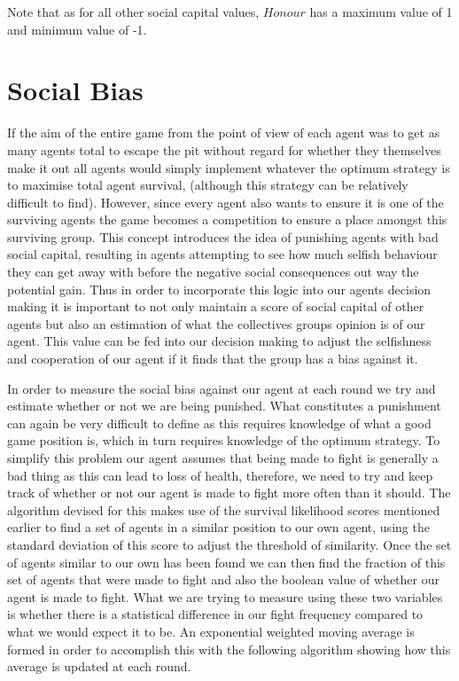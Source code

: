Note that as for all other social capital values, $Honour$ has a maximum value of 1 and minimum value of -1.

\section{Social Bias}

If the aim of the entire game from the point of view of each agent was to get as many agents total to escape the pit without regard for whether they themselves make it out all agents would simply implement whatever the optimum strategy is to maximise total agent survival, (although this strategy can be relatively difficult to find). However, since every agent also wants to ensure it is one of the surviving agents the game becomes a  competition to ensure a place amongst this surviving group. This concept introduces the idea of punishing agents with bad social capital, resulting in agents attempting to see how much selfish behaviour they can get away with before the negative social consequences out way the potential gain. Thus in order to incorporate this logic into our agents decision making it is important to not only maintain a score of social capital of other agents but also an estimation of what the collectives groups opinion is of our agent. This value can be fed into our decision making to adjust the selfishness and cooperation of our agent if it finds that the group has a bias against it. 

In order to measure the social bias against our agent at each round we try and estimate whether or not we are being punished. What constitutes a punishment can again be very difficult to define as this requires knowledge of what a good game position is, which in turn requires knowledge of the optimum strategy. To simplify this problem our agent assumes that being made to fight is generally a bad thing as this can lead to loss of health, therefore, we need to try and keep track of whether or not our agent is made to fight more often than it should. The algorithm devised for this makes use of the survival likelihood scores mentioned earlier to find a set of agents in a similar position to our own agent, using the standard deviation of this score to adjust the threshold of similarity. Once the set of agents similar to our own has been found we can then find the fraction of this set of agents that were made to fight and also the boolean value of whether our agent is made to fight. What we are trying to measure using these two variables is whether there is a statistical difference in our fight frequency compared to what we would expect it to be. 
An exponential weighted moving average is formed in order to accomplish this with the following algorithm showing how this average is updated at each round. 

